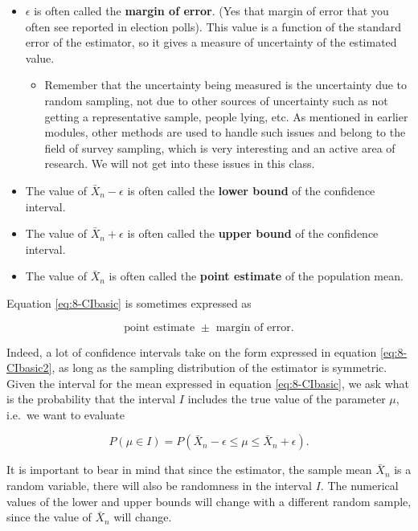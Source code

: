 \documentclass[
]{book}
\providecommand{\tightlist}{%
  \setlength{\itemsep}{0pt}\setlength{\parskip}{0pt}}
\begin{document}
\begin{itemize}
\item
  \(\epsilon\) is often called the \textbf{margin of error}. (Yes that margin of error that you often see reported in election polls). This value is a function of the standard error of the estimator, so it gives a measure of uncertainty of the estimated value.

  \begin{itemize}
  \tightlist
  \item
    Remember that the uncertainty being measured is the uncertainty due to random sampling, not due to other sources of uncertainty such as not getting a representative sample, people lying, etc. As mentioned in earlier modules, other methods are used to handle such issues and belong to the field of survey sampling, which is very interesting and an active area of research. We will not get into these issues in this class.
  \end{itemize}
\item
  The value of \(\bar{X}_n - \epsilon\) is often called the \textbf{lower bound} of the confidence interval.
\item
  The value of \(\bar{X}_n + \epsilon\) is often called the \textbf{upper bound} of the confidence interval.
\item
  The value of \(\bar{X}_n\) is often called the \textbf{point estimate} of the population mean.
\end{itemize}

Equation \eqref{eq:8-CIbasic} is sometimes expressed as

\begin{equation} 
\text{point estimate } \pm \text{ margin of error}.
\label{eq:8-CIbasic2}
\end{equation}

Indeed, a lot of confidence intervals take on the form expressed in equation \eqref{eq:8-CIbasic2}, as long as the sampling distribution of the estimator is symmetric. Given the interval for the mean expressed in equation \eqref{eq:8-CIbasic}, we ask what is the probability that the interval \(I\) includes the true value of the parameter \(\mu\), i.e.~we want to evaluate

\begin{equation} 
P(\mu \in  I) = P(\bar{X}_n - \epsilon \leq \mu \leq \bar{X}_n + \epsilon).
\label{eq:8-CIprob}
\end{equation}

It is important to bear in mind that since the estimator, the sample mean \(\bar{X}_n\) is a random variable, there will also be randomness in the interval \(I\). The numerical values of the lower and upper bounds will change with a different random sample, since the value of \(\bar{X}_n\) will change.
\end{document}
